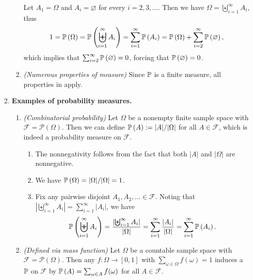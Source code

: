 \begin{enumerate}
\begin{enumerate}
\begin{pf}
Let \(A_1=\Omega\) and \(A_i=\varnothing\) for every \(i=2,3,\dotsc\). Then we
have \(\Omega=\biguplus_{i=1}^{\infty}A_i\), thus
\[
1=\mathbb{P}\left(\Omega\right)=\mathbb{P}\left(\biguplus_{i=1}^{\infty}A_i\right)
=\sum_{i=1}^{\infty}\mathbb{P}\left(A_i\right)
=\mathbb{P}\left(\Omega\right)+\sum_{i=2}^{\infty}\mathbb{P}\left(\varnothing\right),
\]
which implies that \(\sum_{i=2}^{\infty}\mathbb{P}\left(\varnothing\right)=0\), forcing that
\(\mathbb{P}\left(\varnothing\right)=0\).
\end{pf}
\item \emph{(Numerous properties of measure)} Since \(\mathbb{P}\) is a finite
measure, all properties in  apply.
\end{enumerate}
\item \textbf{Examples of probability measures.}
\begin{enumerate}
\item\label{it:comb-prob} \emph{(Combinatorial probability)} Let \(\Omega\) be
a nonempty finite sample space with \(\mathcal{F}=\mathcal{P}(\Omega)\).  Then
we can define \(\mathbb{P}\left(A\right):=|A|/|\Omega|\) for all \(A\in\mathcal{F}\), which is
indeed a probability measure on \(\mathcal{F}\).

\begin{pf}
\begin{enumerate}[label={(\arabic*)}]
\item The nonnegativity follows from the fact that both \(|A|\) and
\(|\Omega|\) are nonnegative.
\item We have \(\mathbb{P}\left(\Omega\right)=|\Omega|/|\Omega|=1\).
\item Fix any pairwise disjoint \(A_1,A_2,\dotsc\in\mathcal{F}\). Noting that
\(\left|\biguplus_{i=1}^{\infty}A_i\right|=\sum_{i=1}^{\infty}|A_i|\), we have
\[
\mathbb{P}\left(\biguplus_{i=1}^{\infty}A_i\right)
=\frac{\left|\biguplus_{i=1}^{\infty}A_i\right|}{|\Omega|}
=\sum_{i=1}^{\infty}\frac{|A_i|}{|\Omega|}
=\sum_{i=1}^{\infty}\mathbb{P}\left(A_i\right).
\]
\end{enumerate}
\end{pf}
\item \emph{(Defined via mass function)} Let \(\Omega\) be a countable sample
space with \(\mathcal{F}=\mathcal{P}(\Omega)\). Then any 
\(f:\Omega\to[0,1]\) with \(\sum_{\omega\in\Omega}^{}f(\omega)=1\) induces a
 \(\mathbb{P}\) on \(\mathcal{F}\) by
\(\mathbb{P}\left(A\right)=\sum_{\omega\in A}^{}f(\omega)\) for all \(A\in\mathcal{F}\).


\end{enumerate}
\end{enumerate}
